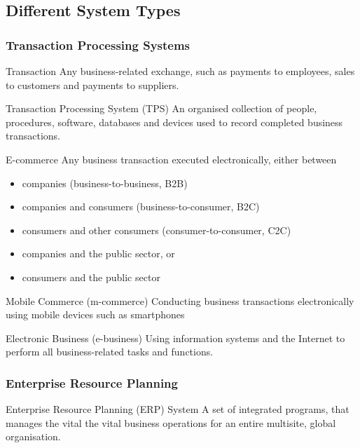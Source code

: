 \documentclass[\main/notes.tex]{subfiles}
\begin{document}
			\subsection{Different System Types}
				\subsubsection{Transaction Processing Systems}
					\begin{definition}{Transaction}
						Any business-related exchange, such as payments to employees, sales to customers and payments to suppliers.
					\end{definition}
					\begin{definition}{Transaction Processing System (TPS)}
						An organised collection of people, procedures, software, databases and devices used to record completed business transactions.
					\end{definition}
					\begin{definition}{E-commerce}
						Any business transaction executed electronically, either between
						\begin{itemize}
							\item companies (business-to-business, B2B)
							\item companies and consumers (business-to-consumer, B2C)
							\item consumers and other consumers (consumer-to-consumer, C2C)
							\item companies and the public sector, or
							\item consumers and the public sector
						\end{itemize}
					\end{definition}
					\begin{definition}{Mobile Commerce (m-commerce)}
						Conducting business transactions electronically using mobile devices such as smartphones
					\end{definition}
					\begin{definition}{Electronic Business (e-business)}
						Using information systems and the Internet to perform all business-related tasks and functions.
					\end{definition}
				\subsubsection{Enterprise Resource Planning}
					\begin{definition}{Enterprise Resource Planning (ERP) System}
						A set of integrated programs, that manages the vital the vital business operations for an entire multisite, global organisation. 
					\end{definition}
\end{document}
